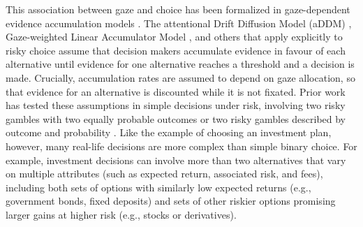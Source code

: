 \documentclass[11pt, a4paper]{article}
\begin{document}
This association between gaze and choice has been formalized in gaze-dependent evidence accumulation models \autocite{cavanagh2014EyeTrackingPupillometry,glickman2019FormationPreferenceRisky,gluth2018ValuebasedAttentionalCapture,krajbich2010VisualFixationsComputation,krajbich2011MultialternativeDriftdiffusionModel,molter2019GLAMboxPythonToolbox,thomas2019GazeBiasDifferences,tavares2017AttentionalDriftDiffusion}. The attentional Drift Diffusion Model (aDDM) \autocite{krajbich2010VisualFixationsComputation}, Gaze-weighted Linear Accumulator Model \autocite{molter2019GLAMboxPythonToolbox,thomas2019GazeBiasDifferences}, and others that apply explicitly to risky choice \autocite{glickman2019FormationPreferenceRisky} assume that decision makers accumulate evidence in favour of each alternative until evidence for one alternative reaches a threshold and a decision is made. Crucially, accumulation rates are assumed to depend on gaze allocation, so that evidence for an alternative is discounted while it is not fixated. Prior work has tested these assumptions in simple decisions under risk, involving two risky gambles with two equally probable outcomes \autocite{smith2018AttentionChoiceDomains} or two risky gambles described by outcome and probability \autocite{glickman2019FormationPreferenceRisky}. Like the example of choosing an investment plan, however, many real-life decisions are more complex than simple binary choice. For example, investment decisions can involve more than two alternatives that vary on multiple attributes (such as expected return, associated risk, and fees), including both sets of options with similarly low expected returns (e.g., government bonds, fixed deposits) and sets of other riskier options promising larger gains at higher risk (e.g., stocks or derivatives).
\end{document}

